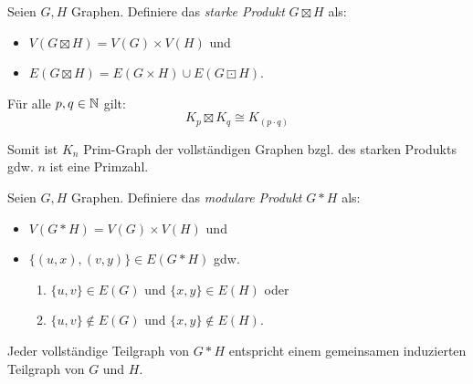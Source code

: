 \begin{definition}
    Seien $ G, H $ Graphen.
    Definiere das \textit{starke Produkt} $ G \boxtimes H $ als:
    \begin{itemize}
        \item $ V(G \boxtimes H) = V(G) \times V(H) $ und
        \item $ E(G \boxtimes H) = E(G \times H) \cup E(G \boxdot H) $.
    \end{itemize}
\end{definition}

\begin{proposition}
    Für alle $ p, q \in \mathbb{N} $ gilt:
    \begin{equation*}
        K_p \boxtimes K_q \cong K_{(p \cdot q)}
    \end{equation*}

    Somit ist $ K_n $ Prim-Graph der vollständigen Graphen bzgl. des starken Produkts gdw. $ n $ ist eine Primzahl.
\end{proposition}

\begin{definition}
    Seien $ G, H $ Graphen.
    Definiere das \textit{modulare Produkt} $ G * H $ als:
    \begin{itemize}
        \item $ V(G * H) = V(G) \times V(H) $ und
        \item $ \{ (u, x), (v, y) \} \in E(G * H) $ gdw.
        \begin{enumerate}
            \item $ \{ u, v \} \in E(G) $ und $ \{ x, y \} \in E(H) $ oder
            \item $ \{ u, v \} \notin E(G) $ und $ \{ x, y \} \notin E(H) $.
        \end{enumerate}
    \end{itemize}
\end{definition}

\begin{remark}
    Jeder vollständige Teilgraph von $ G * H $ entspricht einem gemeinsamen induzierten Teilgraph von $ G $ und $ H $.
\end{remark}
